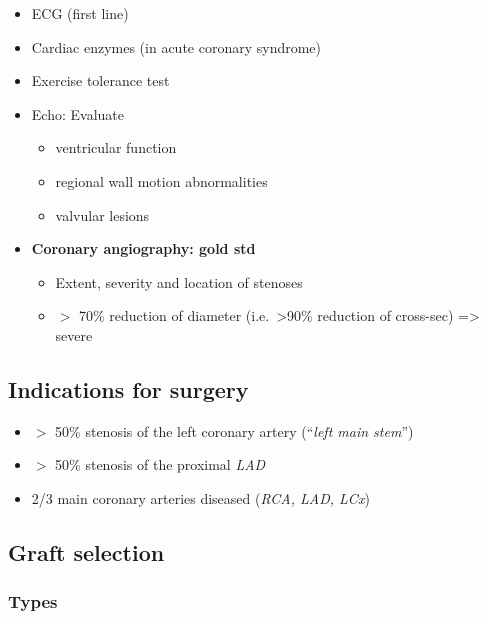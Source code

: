\documentclass[
  12pt,
]{memoir}
\providecommand{\tightlist}{%
  \setlength{\itemsep}{0pt}\setlength{\parskip}{0pt}}
\begin{document}
\begin{itemize}
\tightlist
\item
  ECG (first line)
\item
  Cardiac enzymes (in acute coronary syndrome)
\item
  Exercise tolerance test
\item
  Echo: Evaluate

  \begin{itemize}
  \tightlist
  \item
    ventricular function
  \item
    regional wall motion abnormalities
  \item
    valvular lesions
  \end{itemize}
\item
  \textbf{Coronary angiography: gold std}

  \begin{itemize}
  \tightlist
  \item
    Extent, severity and location of stenoses
  \item
    \(>\) 70\% reduction of diameter (i.e.~\textgreater90\% reduction of
    cross-sec) =\textgreater{} severe
  \end{itemize}
\end{itemize}

\hypertarget{indications-for-surgery}{%
\subsection{Indications for surgery}\label{indications-for-surgery}}

\begin{itemize}
\tightlist
\item
  \(>\) 50\% stenosis of the left coronary artery (``\emph{left main
  stem}'')
\item
  \(>\) 50\% stenosis of the proximal \emph{LAD}
\item
  2/3 main coronary arteries diseased (\emph{RCA, LAD, LCx})
\end{itemize}

\hypertarget{graft-selection}{%
\subsection{Graft selection}\label{graft-selection}}

\hypertarget{types}{%
\subsubsection{Types}\label{types}}
\end{document}
